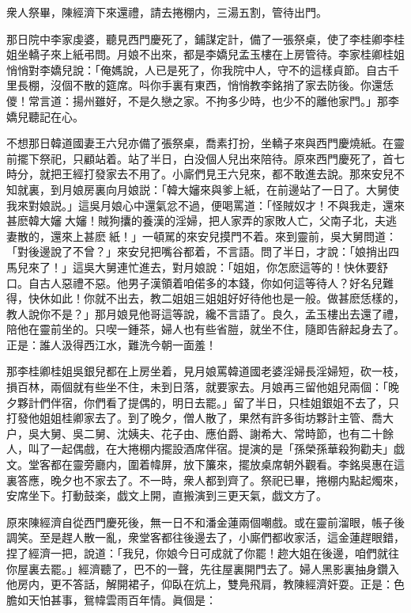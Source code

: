 衆人祭畢，陳經濟下來還禮，請去捲棚内，三湯五割，管待出門。

那日院中李家虔婆，聽見西門慶死了，鋪謀定計，備了一張祭桌，使了李桂卿李桂姐坐轎子來上紙弔問。月娘不出來，都是李嬌兒孟玉樓在上房管待。李家桂卿桂姐悄悄對李嬌兒說：「俺媽說，人已是死了，你我院中人，守不的這樣貞節。自古千里長棚，沒個不散的筵席。呌你手裏有東西，悄悄教李銘捎了家去防後。你還恁儍！常言道：揚州雖好，不是久戀之家。不拘多少時，也少不的離他家門。」那李嬌兒聽記在心。

不想那日韓道國妻王六兒亦備了張祭桌，喬素打扮，坐轎子來與西門慶燒紙。在靈前擺下祭祀，只顧站着。站了半日，白没個人兒出來陪待。原來西門慶死了，首七時分，就把王經打發家去不用了。小廝們見王六兒來，都不敢進去說。那來安兒不知就裏，到月娘房裏向月娘説：「韓大嬸來與爹上紙，在前邊站了一日了。大舅使我來對娘説。」這吳月娘心中還氣忿不過，便喝罵道：「怪賊奴才！不與我走，還來甚麽韓大嬸𣭈大嬸！賊狗攮的養漢的淫婦，把人家弄的家敗人亡，父南子北，夫逃妻散的，還來上甚麽𣭈紙！」一頓駡的來安兒摸門不着。來到靈前，吳大舅問道：「對後邊說了不曾？」來安兒把嘴谷都着，不言語。問了半日，才說：「娘捎出四馬兒來了！」這吳大舅連忙進去，對月娘說：「姐姐，你怎麽這等的！快休要舒口。自古人惡禮不惡。他男子漢領着咱偌多的本錢，你如何這等待人？好名兒難得，快休如此！你就不出去，教二姐姐三姐姐好好待他也是一般。做甚麽恁樣的，教人說你不是？」那月娘見他哥這等說，纔不言語了。良久，孟玉樓出去還了禮，陪他在靈前坐的。只喫一鍾茶，婦人也有些省䐩，就坐不住，隨即告辭起身去了。正是：誰人汲得西江水，難洗今朝一面羞！

那李桂卿桂姐吳銀兒都在上房坐着，見月娘罵韓道國老婆淫婦長淫婦短，砍一枝，損百林，兩個就有些坐不住，未到日落，就要家去。月娘再三留他姐兒兩個：「晚夕夥計們伴宿，你們看了提偶的，明日去罷。」留了半日，只桂姐銀姐不去了，只打發他姐姐桂卿家去了。到了晚夕，僧人散了，果然有許多街坊夥計主管、喬大户，吳大舅、吳二舅、沈姨夫、花子由、應伯爵、謝希大、常時節，也有二十餘人，叫了一起偶戲，在大捲棚内擺設酒席伴宿。提演的是「孫榮孫華殺狗勸夫」戯文。堂客都在靈旁廳内，圍着幃屏，放下簾來，擺放桌席朝外觀看。李銘吳惠在這裏答應，晚夕也不家去了。不一時，衆人都到齊了。祭祀已畢，捲棚内點起燭來，安席坐下。打動鼓楽，戯文上開，直搬演到三更天氣，戯文方了。

原來陳經濟自從西門慶死後，無一日不和潘金蓮兩個嘲戲。或在靈前溜眼，帳子後調笑。至是趕人散一亂，衆堂客都往後邊去了，小廝們都收家活，這金蓮趕眼錯，捏了經濟一把，說道：「我兒，你娘今日可成就了你罷！趂大姐在後邊，咱們就往你屋裏去罷。」經濟聽了，巴不的一聲，先往屋裏開門去了。婦人黑影裏抽身鑽入他房内，更不答話，解開裙子，仰臥在炕上，雙鳧飛肩，教陳經濟奸耍。正是：色膽如天怕甚事，鴛幃雲雨百年情。眞個是：

